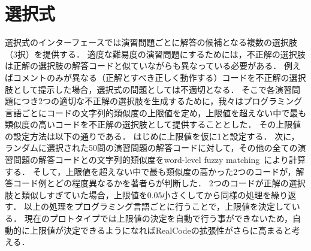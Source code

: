 \section{選択式}

選択式のインターフェースでは演習問題ごとに解答の候補となる複数の選択肢（3択）を提供する．
適度な難易度の演習問題にするためには，不正解の選択肢は正解の選択肢の解答コードと似ていながらも異なっている必要がある．
例えばコメントのみが異なる（正解とすべき正しく動作する）コードを不正解の選択肢として提示した場合，選択式の問題としては不適切となる．
そこで各演習問題につき2つの適切な不正解の選択肢を生成するために，我々はプログラミング言語ごとにコードの文字列的類似度の上限値を定め，上限値を超えない中で最も類似度の高いコードを不正解の選択肢として提供することとした．
その上限値の設定方法は以下の通りである．
はじめに上限値を仮に1と設定する．
次に，ランダムに選択された50問の演習問題の解答コードに対して，その他の全ての演習問題の解答コードとの文字列的類似度をword-level fuzzy matching~\cite{sankoff1983time}により計算する．
そして，上限値を超えない中で最も類似度の高かった2つのコードが，解答コード例とどの程度異なるかを著者らが判断した．
2つのコードが正解の選択肢と類似しすぎていた場合，上限値を0.05小さくしてから同様の処理を繰り返す．
以上の処理をプログラミング言語ごとに行うことで，上限値を決定している．
現在のプロトタイプでは上限値の決定を自動で行う事ができないため，自動的に上限値が決定できるようになればRealCodeの拡張性がさらに高まると考える．

